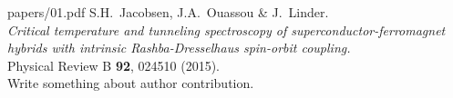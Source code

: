 \begin{paper}{papers/01.pdf}
  S.H.~Jacobsen, J.A.~Ouassou \& J.~Linder.\\
  \textit{Critical temperature and tunneling spectroscopy of superconductor-ferromagnet hybrids with intrinsic Rashba-Dresselhaus spin-orbit coupling.} \\
  Physical Review B \textbf{92}, 024510 (2015).\\

  \noindent
  Write something about author contribution.
\end{paper}
